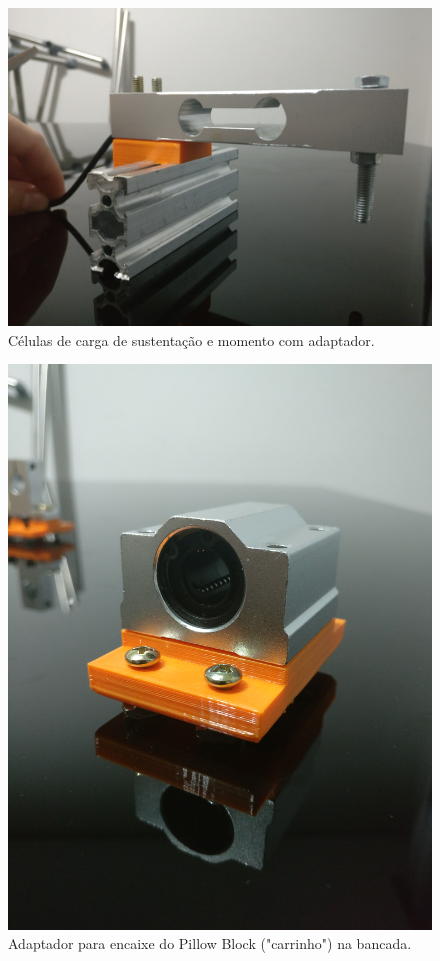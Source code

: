 \begin{figure}[!ht]
    \centering
    \includegraphics[width=.8\linewidth]{figuras/construcao/suporte_reforcado_celulas_1.jpg}
    \caption{Células de carga de sustentação e momento com adaptador\cite{autor}.}
    \label{fig:encaixe_celulas_sustentacao_2}
\end{figure}

\begin{figure}[!ht]
    \centering
    \includegraphics[width=.8\linewidth]{figuras/construcao/encaixe_pillow.jpg}
    \caption{Adaptador para encaixe do Pillow Block ("carrinho") na bancada\cite{autor}.}
    \label{fig:adaptador_pillow}
\end{figure}

